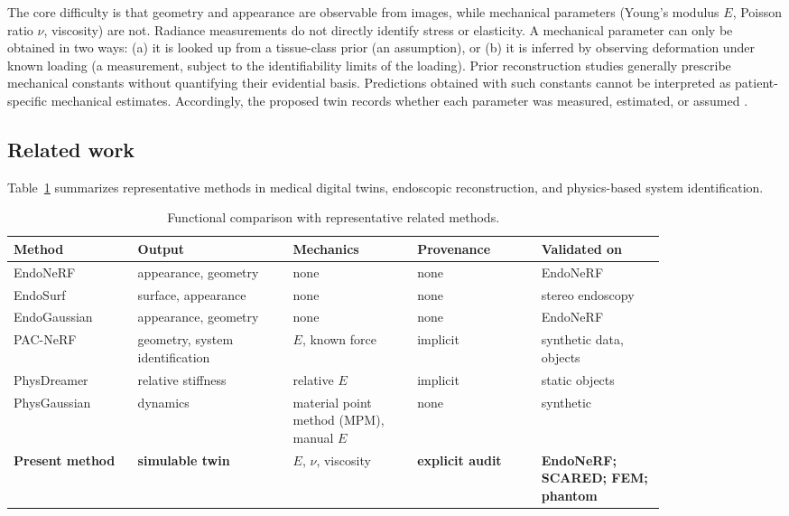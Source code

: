 \documentclass[pdflatex,lineno,referee,sn-vancouver,Numbered]{sn-jnl}
\begin{document}
The core difficulty is that geometry and appearance are observable from
images, while mechanical parameters (Young's modulus $E$, Poisson ratio
$\nu$, viscosity) are not. Radiance measurements do not directly identify
stress or elasticity. A
mechanical parameter can only be obtained in two ways: (a) it is looked up
from a tissue-class prior (an assumption), or (b) it is inferred by
observing deformation under known loading (a measurement, subject to the
identifiability limits of the loading). Prior reconstruction studies
generally prescribe mechanical constants without quantifying their
evidential basis. Predictions obtained with such constants cannot be
interpreted as patient-specific mechanical estimates. Accordingly, the
proposed twin records whether each parameter was measured, estimated, or
assumed \cite{landig2025}.

\subsection{Related work}
\label{sec:related}

Table~\ref{tab:position} summarizes representative methods in medical
digital twins, endoscopic reconstruction, and physics-based system
identification.

\begin{table}[htbp]
\centering
\caption{Functional comparison with representative related methods.}
\label{tab:position}
\footnotesize
\begin{tabular}{@{}p{0.16\linewidth}p{0.20\linewidth}p{0.16\linewidth}p{0.16\linewidth}p{0.16\linewidth}@{}}
\toprule
Method & Output & Mechanics & Provenance & Validated on \\
\midrule
EndoNeRF \cite{endonerf} & appearance, geometry & none & none & EndoNeRF \\
EndoSurf \cite{endosurf} & surface, appearance & none & none & stereo endoscopy \\
EndoGaussian \cite{endogaussian} & appearance, geometry & none & none & EndoNeRF \\
PAC-NeRF \cite{pacnerf} & geometry, system identification & $E$, known force & implicit & synthetic data, objects \\
PhysDreamer \cite{physdreamer} & relative stiffness & relative $E$ & implicit & static objects \\
PhysGaussian \cite{physgaussian} & dynamics & material point method (MPM), manual $E$ & none & synthetic \\
\textbf{Present method} & \textbf{simulable twin} & $E$, $\nu$, viscosity & \textbf{explicit audit} & \textbf{EndoNeRF; SCARED; FEM; phantom} \\
\bottomrule
\end{tabular}
\end{table}
\end{document}
